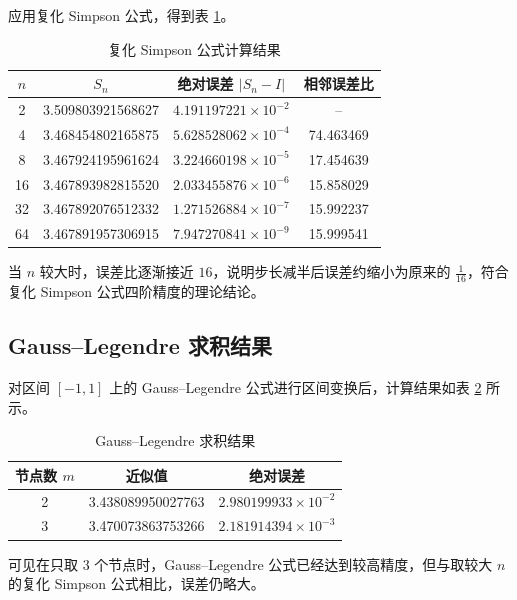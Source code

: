 \documentclass[12pt,a4paper]{ctexart}
\begin{document}
应用复化 Simpson 公式，得到表 \ref{tab:simpson}。

\begin{table}[H]
    \centering
    \caption{复化 Simpson 公式计算结果}
    \label{tab:simpson}
    \begin{tabular}{cccc}
        \toprule
        $n$ & $S_n$ & 绝对误差 $|S_n-I|$ & 相邻误差比 \\
        \midrule
        2  & 3.509803921568627 & $4.191197221\times 10^{-2}$ & -- \\
        4  & 3.468454802165875 & $5.628528062\times 10^{-4}$ & 74.463469 \\
        8  & 3.467924195961624 & $3.224660198\times 10^{-5}$ & 17.454639 \\
        16 & 3.467893982815520 & $2.033455876\times 10^{-6}$ & 15.858029 \\
        32 & 3.467892076512332 & $1.271526884\times 10^{-7}$ & 15.992237 \\
        64 & 3.467891957306915 & $7.947270841\times 10^{-9}$ & 15.999541 \\
        \bottomrule
    \end{tabular}
\end{table}

当 $n$ 较大时，误差比逐渐接近 $16$，说明步长减半后误差约缩小为原来的 $\frac{1}{16}$，符合复化 Simpson 公式四阶精度的理论结论。

\subsection{Gauss--Legendre 求积结果}

对区间 $[-1,1]$ 上的 Gauss--Legendre 公式进行区间变换后，计算结果如表 \ref{tab:gauss} 所示。

\begin{table}[H]
    \centering
    \caption{Gauss--Legendre 求积结果}
    \label{tab:gauss}
    \begin{tabular}{ccc}
        \toprule
        节点数 $m$ & 近似值 & 绝对误差 \\
        \midrule
        2 & 3.438089950027763 & $2.980199933\times 10^{-2}$ \\
        3 & 3.470073863753266 & $2.181914394\times 10^{-3}$ \\
        \bottomrule
    \end{tabular}
\end{table}

可见在只取 $3$ 个节点时，Gauss--Legendre 公式已经达到较高精度，但与取较大 $n$ 的复化 Simpson 公式相比，误差仍略大。
\end{document}
